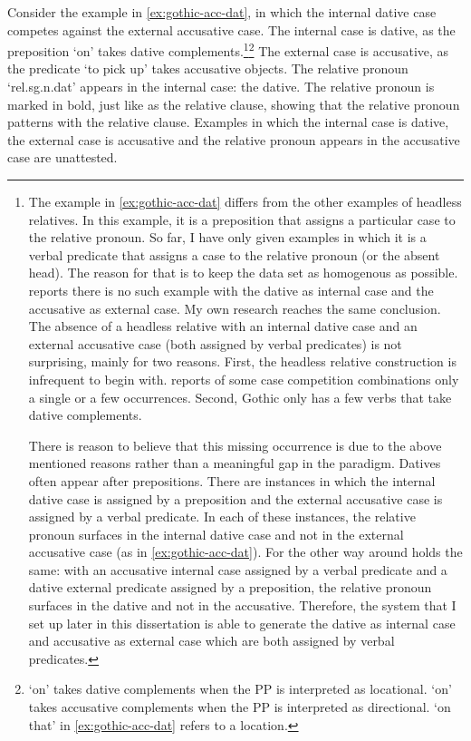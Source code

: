 Consider the example in \ref{ex:gothic-acc-dat}, in which the internal dative case competes against the external accusative case.
The internal case is dative, as the preposition  `on' takes dative complements.\footnote{
The example in \ref{ex:gothic-acc-dat} differs from the other examples of headless relatives. In this example, it is a preposition that assigns a particular case to the relative pronoun. So far, I have only given examples in which it is a verbal predicate that assigns a case to the relative pronoun (or the absent head). The reason for that is to keep the data set as homogenous as possible. \citet{harbert1978} reports there is no such example with the dative as internal case and the accusative as external case. My own research reaches the same conclusion. The absence of a headless relative with an internal dative case and an external accusative case (both assigned by verbal predicates) is not surprising, mainly for two reasons. First, the headless relative construction is infrequent to begin with. \citeauthor{harbert1978} reports of some case competition combinations only a single or a few occurrences.
Second, Gothic only has a few verbs that take dative complements.

There is reason to believe that this missing occurrence is due to the above mentioned reasons rather than a meaningful gap in the paradigm. Datives often appear after prepositions. There are instances in which the internal dative case is assigned by a preposition and the external accusative case is assigned by a verbal predicate. In each of these instances, the relative pronoun surfaces in the internal dative case and not in the external accusative case (as in \ref{ex:gothic-acc-dat}). For the other way around holds the same: with an accusative internal case assigned by a verbal predicate and a dative external predicate assigned by a preposition, the relative pronoun surfaces in the dative and not in the accusative. Therefore, the system that I set up later in this dissertation is able to generate the dative as internal case and accusative as external case which are both assigned by verbal predicates.
}\footnote{
 `on' takes dative complements when the PP is interpreted as locational.  `on' takes accusative complements when the PP is interpreted as directional.  `on that' in \ref{ex:gothic-acc-dat} refers to a location.
}
The external case is accusative, as the predicate  `to pick up' takes accusative objects.
The relative pronoun  `\ac{rel}.\ac{sg}.\ac{n}.\ac{dat}' appears in the internal case: the dative. The relative pronoun is marked in bold, just like as the relative clause, showing that the relative pronoun patterns with the relative clause.
Examples in which the internal case is dative, the external case is accusative and the relative pronoun appears in the accusative case are unattested.

